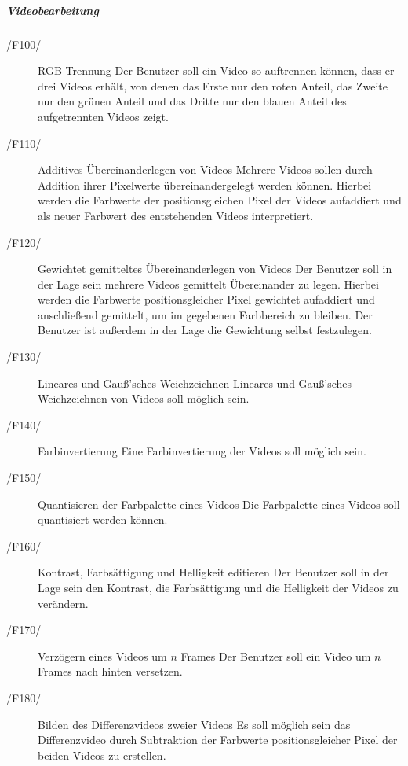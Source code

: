 \subparagraph{Videobearbeitung}
\begin{description}
        \item[/F100/]RGB-Trennung \newline
                 Der Benutzer soll ein Video so auftrennen können, dass er drei Videos erhält, von denen das Erste nur den roten Anteil, das Zweite nur den grünen Anteil und das Dritte nur den blauen Anteil des aufgetrennten Videos zeigt.
        \item[/F110/]Additives  Übereinanderlegen von Videos \newline
                Mehrere Videos sollen durch Addition ihrer Pixelwerte übereinandergelegt werden können. Hierbei werden die Farbwerte der positionsgleichen Pixel der Videos aufaddiert und als neuer Farbwert des entstehenden Videos interpretiert.
        \item[/F120/]Gewichtet gemitteltes Übereinanderlegen von  Videos \newline
                Der Benutzer soll in der Lage sein mehrere Videos gemittelt Übereinander zu legen. Hierbei werden die Farbwerte positionsgleicher Pixel gewichtet aufaddiert und anschließend gemittelt, um im gegebenen Farbbereich zu bleiben. Der Benutzer ist außerdem in der Lage die Gewichtung selbst festzulegen.
        \item[/F130/]Lineares und Gauß'sches Weichzeichnen \newline
                Lineares und Gauß'sches Weichzeichnen von Videos soll möglich sein.
        \item[/F140/]Farbinvertierung \newline
                Eine Farbinvertierung der Videos soll möglich sein.
        \item[/F150/]Quantisieren der Farbpalette eines Videos \newline
                Die Farbpalette eines Videos soll quantisiert werden können. %
        \item[/F160/]Kontrast, Farbsättigung und Helligkeit editieren \newline
                Der Benutzer soll in der Lage sein den Kontrast, die Farbsättigung und die Helligkeit der Videos zu verändern.
        \item[/F170/]Verzögern eines Videos um $n$ Frames \newline
                Der Benutzer soll ein Video um $n$ Frames nach hinten versetzen.       
        \item[/F180/]Bilden des Differenzvideos zweier Videos \newline
                Es soll möglich sein das Differenzvideo durch Subtraktion der Farbwerte positionsgleicher Pixel der beiden Videos zu erstellen.
\end{description}
 
